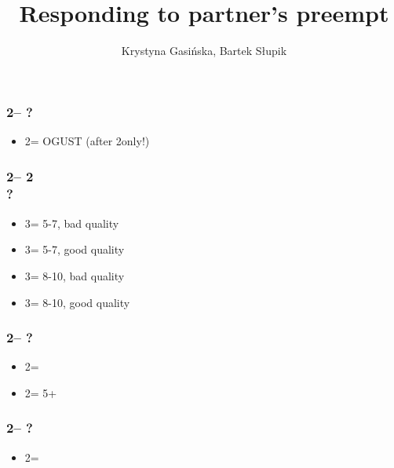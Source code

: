 \documentclass[12pt, a4paper]{article}
\title{Responding to partner's preempt}
\author{Krystyna Gasińska, Bartek Słupik}
\begin{document}
\maketitle


\subsubsection*{2\diams -- ?}
\begin{itemize}
    \item 2\nt = OGUST (after 2\diams only!)
\end{itemize}

\subsubsection*{2\diams -- 2\diams \\ ?}
\begin{itemize}
    \item 3\clubs = 5-7, bad \diams quality
    \item 3\diams = 5-7, good \diams quality
    \item 3\hearts = 8-10, bad \diams quality
    \item 3\spades = 8-10, good \diams quality
\end{itemize}

\subsubsection*{2\hearts -- ?}
\begin{itemize}
    \item 2\spades = \lsf
    \item 2\nt = 5+\spades
\end{itemize}

\subsubsection*{2\spades -- ?}
\begin{itemize}
    \item 2\nt = \lsf
\end{itemize}

\end{document}
